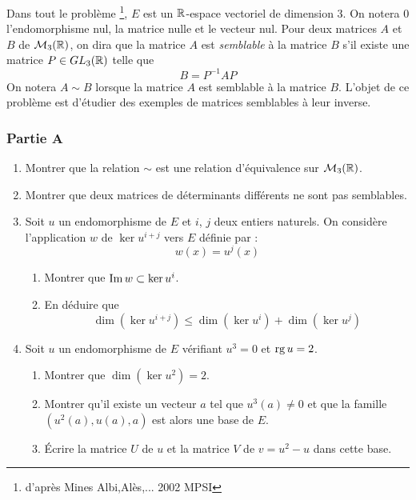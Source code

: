 Dans tout le problème \footnote{d'après Mines Albi,Alès,... 2002 MPSI}, $E$ est un $\mathbb{R}$-espace vectoriel de dimension 3.\newline
On notera $0$ l'endomorphisme nul, la matrice nulle et le vecteur nul.\newline
Pour deux matrices $A$ et $B$ de $\mathcal{M}_3(\mathbb{R})$, on dira que la matrice $A$ est \emph{semblable} à la matrice $B$ s'il existe une matrice $P\in GL_3(\mathbb{R})$ telle que 
\[B=P^{-1}AP\]
On notera $A\sim B$ lorsque la matrice $A$ est semblable à la matrice $B$.\newline
L'objet de ce problème est d'étudier des exemples de matrices semblables à leur inverse.
\subsubsection*{Partie A}
\begin{enumerate}
 \item Montrer que la relation $\sim$ est une relation d'équivalence sur $\mathcal{M}_3(\mathbb{R})$.
\item Montrer que deux matrices de déterminants différents ne sont pas semblables.
\item Soit $u$ un endomorphisme de $E$ et $i$, $j$ deux entiers naturels. On considère l'application $w$ de $\ker u^{i+j}$ vers $E$ définie par :
\[w(x)=u^j(x)\]
\begin{enumerate}
 \item Montrer que $\operatorname{Im} w \subset \ker u^i$.
\item En déduire que
\[\dim(\ker u^{i+j})\leq \dim(\ker u^{i}) + \dim(\ker u^{j})\]
\end{enumerate}
\item Soit $u$ un endomorphisme de $E$ vérifiant $u^3=0$ et $\operatorname{rg} u =2$.
\begin{enumerate}
 \item Montrer que $\dim (\ker u^2)=2$.
 \item Montrer qu'il existe un vecteur $a$ tel que $u^3(a)\neq 0$ et que la famille $(u^2(a),u(a),a)$ est alors une base de $E$.
 \item \'Ecrire la matrice $U$ de $u$  et la matrice $V$ de $v=u^2-u$ dans cette base.
\end{enumerate}

\end{enumerate}

